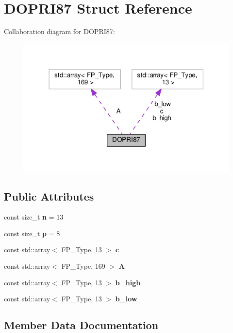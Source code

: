 \hypertarget{structDOPRI87}{}\section{D\+O\+P\+R\+I87 Struct Reference}
\label{structDOPRI87}


Collaboration diagram for D\+O\+P\+R\+I87\+:\nopagebreak
\begin{figure}[H]
\begin{center}
\leavevmode
\includegraphics[width=318pt]{structDOPRI87__coll__graph}
\end{center}
\end{figure}
\subsection*{Public Attributes}
\begin{DoxyCompactItemize}
\item 
\mbox{\label{structDOPRI87_a5be2549f8041e5c535e477493f284ccb}} 
const size\+\_\+t {\bfseries n} = 13
\item 
\mbox{\label{structDOPRI87_a765f5d126f15435e636c9f38a554f35f}} 
const size\+\_\+t {\bfseries p} = 8
\item 
const std\+::array$<$ F\+P\+\_\+\+Type, 13 $>$ {\bfseries c}
\item 
const std\+::array$<$ F\+P\+\_\+\+Type, 169 $>$ {\bfseries A}
\item 
const std\+::array$<$ F\+P\+\_\+\+Type, 13 $>$ {\bfseries b\+\_\+high}
\item 
const std\+::array$<$ F\+P\+\_\+\+Type, 13 $>$ {\bfseries b\+\_\+low}
\end{DoxyCompactItemize}


\subsection{Member Data Documentation}
\mbox{\label{structDOPRI87_a58504e2f3eabbf35b2d4f0e54ebb8d5f}} 
